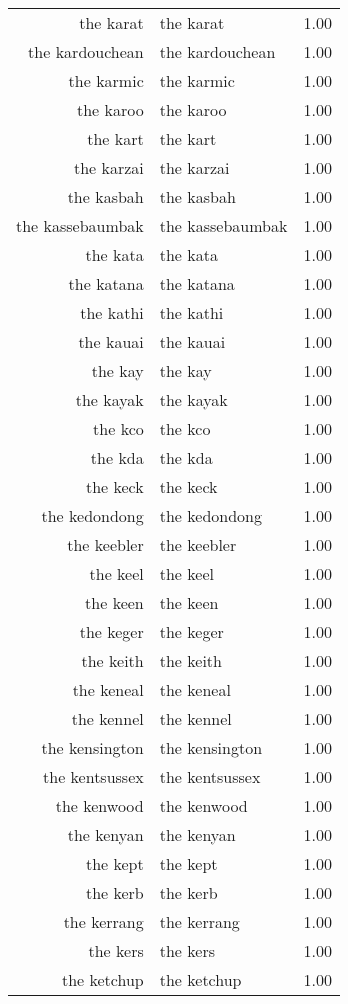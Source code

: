 \begin{table}[ht]
\begin{tabular}{rlr}
  the karat & the karat & 1.00 \\ 
  the kardouchean & the kardouchean & 1.00 \\ 
  the karmic & the karmic & 1.00 \\ 
  the karoo & the karoo & 1.00 \\ 
  the kart & the kart & 1.00 \\ 
  the karzai & the karzai & 1.00 \\ 
  the kasbah & the kasbah & 1.00 \\ 
  the kassebaumbak & the kassebaumbak & 1.00 \\ 
  the kata & the kata & 1.00 \\ 
  the katana & the katana & 1.00 \\ 
  the kathi & the kathi & 1.00 \\ 
  the kauai & the kauai & 1.00 \\ 
  the kay & the kay & 1.00 \\ 
  the kayak & the kayak & 1.00 \\ 
  the kco & the kco & 1.00 \\ 
  the kda & the kda & 1.00 \\ 
  the keck & the keck & 1.00 \\ 
  the kedondong & the kedondong & 1.00 \\ 
  the keebler & the keebler & 1.00 \\ 
  the keel & the keel & 1.00 \\ 
  the keen & the keen & 1.00 \\ 
  the keger & the keger & 1.00 \\ 
  the keith & the keith & 1.00 \\ 
  the keneal & the keneal & 1.00 \\ 
  the kennel & the kennel & 1.00 \\ 
  the kensington & the kensington & 1.00 \\ 
  the kentsussex & the kentsussex & 1.00 \\ 
  the kenwood & the kenwood & 1.00 \\ 
  the kenyan & the kenyan & 1.00 \\ 
  the kept & the kept & 1.00 \\ 
  the kerb & the kerb & 1.00 \\ 
  the kerrang & the kerrang & 1.00 \\ 
  the kers & the kers & 1.00 \\ 
  the ketchup & the ketchup & 1.00 \\ 

\end{tabular}
\end{table}
